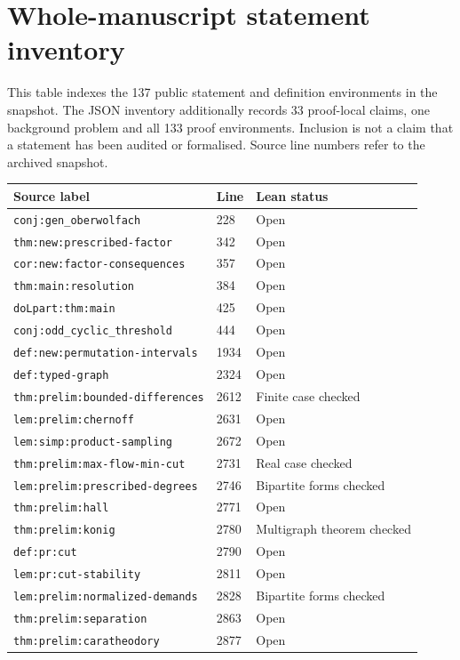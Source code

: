 \appendix
\chapter{Whole-manuscript statement inventory}
This table indexes the 137 public statement and definition environments in the
snapshot. The JSON inventory additionally records 33 proof-local claims,
one background problem and all 133 proof environments. Inclusion is not a claim
that a statement has been audited or formalised. Source line numbers refer to
the archived snapshot.
\small
\begin{tabular}{lll}
\toprule Source label & Line & Lean status \\ \midrule
\nolinkurl{conj:gen_oberwolfach} & 228 & Open \\
\nolinkurl{thm:new:prescribed-factor} & 342 & Open \\
\nolinkurl{cor:new:factor-consequences} & 357 & Open \\
\nolinkurl{thm:main:resolution} & 384 & Open \\
\nolinkurl{doLpart:thm:main} & 425 & Open \\
\nolinkurl{conj:odd_cyclic_threshold} & 444 & Open \\
\nolinkurl{def:new:permutation-intervals} & 1934 & Open \\
\nolinkurl{def:typed-graph} & 2324 & Open \\
\nolinkurl{thm:prelim:bounded-differences} & 2612 & Finite case checked \\
\nolinkurl{lem:prelim:chernoff} & 2631 & Open \\
\nolinkurl{lem:simp:product-sampling} & 2672 & Open \\
\nolinkurl{thm:prelim:max-flow-min-cut} & 2731 & Real case checked \\
\nolinkurl{lem:prelim:prescribed-degrees} & 2746 & Bipartite forms checked \\
\nolinkurl{thm:prelim:hall} & 2771 & Open \\
\nolinkurl{thm:prelim:konig} & 2780 & Multigraph theorem checked \\
\nolinkurl{def:pr:cut} & 2790 & Open \\
\nolinkurl{lem:pr:cut-stability} & 2811 & Open \\
\nolinkurl{lem:prelim:normalized-demands} & 2828 & Bipartite forms checked \\
\nolinkurl{thm:prelim:separation} & 2863 & Open \\
\nolinkurl{thm:prelim:caratheodory} & 2877 & Open \\

\end{tabular}
